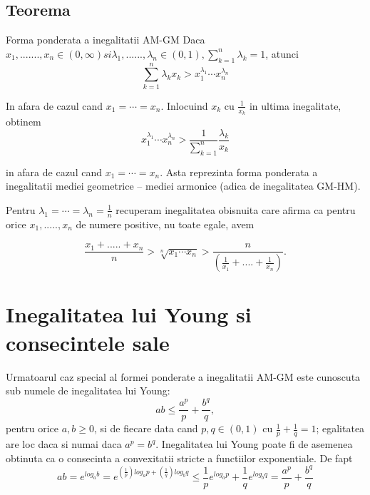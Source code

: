 \documentclass[a4paper,12pt,oneside]{report}
\begin{document}
\subsection{Teorema}
Forma ponderata a inegalitatii AM-GM
Daca \(x_{1},.......,x_{n}\in \left ( 0,\infty  \right ) si \lambda_{1},......,\lambda _{n} \in \left ( 0 , 1 \right ), \sum_{k = 1}^{n}\lambda _{k}= 1\), atunci
\begin{displaymath}
  \sum_{k = 1}^{n}\lambda _{k}x_{k}> x_{1}^{\lambda _{1}}\cdots x_{n}^{\lambda _{n}}
\end{displaymath}

In afara de cazul cand \(x_{1} = \cdots = x_{n}\). 
	Inlocuind \(x_{k}\) cu \(\frac{1}{x_{k} }\) in ultima inegalitate, obtinem 
\begin{displaymath}
  x_{1}^{\lambda _{1}}\cdots x_{n}^{\lambda _{n}}> \frac{1}{\sum_{k = 1}^{n}}\frac{\lambda _{k}}{x_{k}}
\end{displaymath}

in afara de cazul cand \(x_{1} = \cdots = x_{n}\). 
Asta reprezinta forma ponderata a inegalitatii mediei geometrice – mediei armonice (adica de inegalitatea GM-HM). 

Pentru \(\lambda _{1} = \cdots =\lambda _{n}= \frac{1}{n}\) recuperam inegalitatea obisnuita care afirma ca pentru orice \(x_{1},.....,x_{n}\) de numere positive, nu toate egale, avem

\begin{displaymath}
  \frac{x_{1}+.....+x_{n}}{n}> \sqrt[n]{x_{1}\cdots x_{n}}> \frac{n}{\left ( \frac{1}{x_{1}}+....+\frac{1}{x_{n}} \right )}. 
\end{displaymath}




\section{Inegalitatea lui Young si consecintele sale}

Urmatoarul caz special al formei ponderate a inegalitatii AM-GM este cunoscuta sub numele de inegalitatea lui Young:  
\begin{displaymath}
  ab \leq \frac{a^{p}}{p}+ \frac{b^{q}}{q},
\end{displaymath}
pentru orice \(a,b \geq 0\),
si de fiecare data cand  \(p,q \in \left ( 0 , 1 \right )\) cu \(\frac{1}{p}+\frac{1}{q} = 1\); egalitatea are loc daca si numai daca \(a^{p}= b^{q}\). Inegalitatea lui Young poate fi de asemenea obtinuta ca o consecinta a convexitatii stricte a functiilor exponentiale. De fapt 
\begin{displaymath}
  ab = e^{log_{a}b}= e^{\left (\frac{1}{p}  \right )log_{a}p+ \left ( \frac{1}{q} \right )log_{b}q}
\leq \frac{1}{p}e^{log_{a}p}+\frac{1}{q}e^{log_{b}q}= \frac{a^{p}}{p}+\frac{b^{q}}{q}
\end{displaymath}
\end{document}
